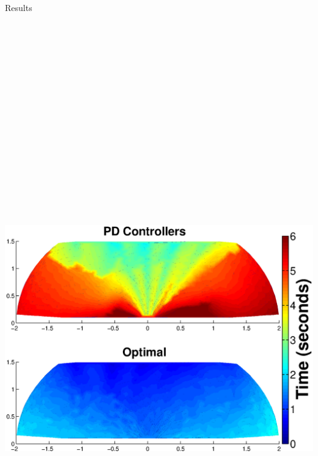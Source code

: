 \documentclass[final]{beamer}
\begin{document}
\begin{frame}{}
{\begin{columns}[t]
\begin{column}{.30\linewidth}
\begin{block}{\centering Results}
	\centering\includegraphics[height=28cm, width=28cm]{figures/Controller_vs_Optimal_Time.eps}


\end{block}
\end{column}
\end{columns}}
\end{frame}
\end{document}
